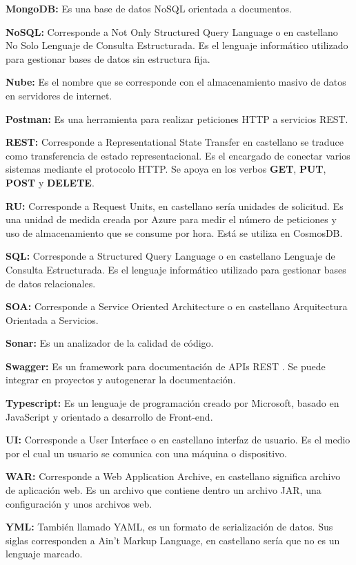 \documentclass[12pt]{report} %
\begin{document}
\textbf{MongoDB:} Es una base de datos NoSQL orientada a documentos.

\textbf{NoSQL:} Corresponde a Not Only Structured Query Language o en castellano No Solo Lenguaje de Consulta Estructurada. Es el lenguaje informático utilizado para gestionar bases de datos sin estructura fija.

\textbf{Nube:} Es el nombre que se corresponde con el almacenamiento masivo de datos en servidores de internet.

\textbf{Postman:} Es una herramienta para realizar peticiones HTTP a servicios REST.

\textbf{REST:} Corresponde a Representational State Transfer en castellano se traduce como transferencia de estado representacional. Es el encargado de conectar varios sistemas mediante el protocolo HTTP. Se apoya en los verbos \textbf{GET}, \textbf{PUT}, \textbf{POST} y  \textbf{DELETE}.

\textbf{RU:} Corresponde a Request Units, en castellano sería unidades de solicitud. Es una unidad de medida creada por Azure para medir el número de peticiones y uso de almacenamiento que se consume por hora. Está se utiliza en CosmosDB.

\textbf{SQL:} Corresponde a Structured Query Language o en castellano Lenguaje de Consulta Estructurada. Es el lenguaje informático utilizado para gestionar bases de datos relacionales.

\textbf{SOA:} Corresponde a Service Oriented Architecture o en castellano Arquitectura Orientada a Servicios.

\textbf{Sonar:} Es un analizador de la calidad de código.

\textbf{Swagger:} Es un framework para documentación de APIs REST \cite{swagger}. Se puede integrar en proyectos y autogenerar la documentación.

\textbf{Typescript:} Es un lenguaje de programación creado por Microsoft, basado en JavaScript y orientado a desarrollo de Front-end.

\textbf{UI:} Corresponde a User Interface o en castellano interfaz de usuario. Es el medio por el cual un usuario se comunica con una máquina o dispositivo.

\textbf{WAR:} Corresponde a Web Application Archive, en castellano significa archivo de aplicación web. Es un archivo que contiene dentro un archivo JAR, una configuración y unos archivos web.

\textbf{YML:} También llamado YAML, es un formato de serialización de datos. Sus siglas corresponden a Ain't Markup Language, en castellano sería que no es un lenguaje marcado.
\end{document}
